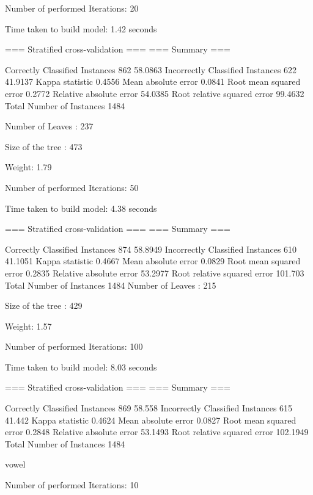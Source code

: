 Number of performed Iterations: 20


Time taken to build model: 1.42 seconds

=== Stratified cross-validation ===
=== Summary ===

Correctly Classified Instances         862               58.0863 %
Incorrectly Classified Instances       622               41.9137 %
Kappa statistic                          0.4556
Mean absolute error                      0.0841
Root mean squared error                  0.2772
Relative absolute error                 54.0385 %
Root relative squared error             99.4632 %
Total Number of Instances             1484

Number of Leaves  : 	237

Size of the tree : 	473


Weight: 1.79

Number of performed Iterations: 50


Time taken to build model: 4.38 seconds

=== Stratified cross-validation ===
=== Summary ===

Correctly Classified Instances         874               58.8949 %
Incorrectly Classified Instances       610               41.1051 %
Kappa statistic                          0.4667
Mean absolute error                      0.0829
Root mean squared error                  0.2835
Relative absolute error                 53.2977 %
Root relative squared error            101.703  %
Total Number of Instances             1484     
Number of Leaves  : 	215

Size of the tree : 	429


Weight: 1.57

Number of performed Iterations: 100


Time taken to build model: 8.03 seconds

=== Stratified cross-validation ===
=== Summary ===

Correctly Classified Instances         869               58.558  %
Incorrectly Classified Instances       615               41.442  %
Kappa statistic                          0.4624
Mean absolute error                      0.0827
Root mean squared error                  0.2848
Relative absolute error                 53.1493 %
Root relative squared error            102.1949 %
Total Number of Instances             1484

vowel

Number of performed Iterations: 10


